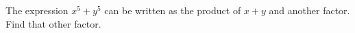 The expression $x^5+y^5$ can be written as the product of $x+y$ and another factor. Find that other factor.
